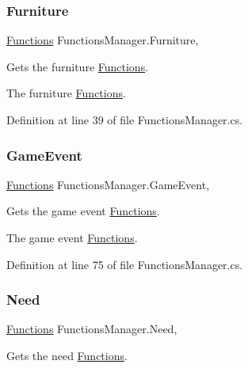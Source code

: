 \subsubsection{\texorpdfstring{Furniture}{Furniture}}
{\footnotesize\ttfamily \hyperlink{class_functions}{Functions} Functions\+Manager.\+Furniture\hspace{0.3cm}{\ttfamily [static]}, {\ttfamily [get]}}



Gets the furniture \hyperlink{class_functions}{Functions}. 

The furniture \hyperlink{class_functions}{Functions}.

Definition at line 39 of file Functions\+Manager.\+cs.

\mbox{\label{class_functions_manager_a4644c25bbcf8f5c115db158619b66247}} 
\subsubsection{\texorpdfstring{Game\+Event}{GameEvent}}
{\footnotesize\ttfamily \hyperlink{class_functions}{Functions} Functions\+Manager.\+Game\+Event\hspace{0.3cm}{\ttfamily [static]}, {\ttfamily [get]}}



Gets the game event \hyperlink{class_functions}{Functions}. 

The game event \hyperlink{class_functions}{Functions}.

Definition at line 75 of file Functions\+Manager.\+cs.

\mbox{\label{class_functions_manager_abe4e76cc6cb819da231ba52ba559972d}} 
\subsubsection{\texorpdfstring{Need}{Need}}
{\footnotesize\ttfamily \hyperlink{class_functions}{Functions} Functions\+Manager.\+Need\hspace{0.3cm}{\ttfamily [static]}, {\ttfamily [get]}}



Gets the need \hyperlink{class_functions}{Functions}. 

